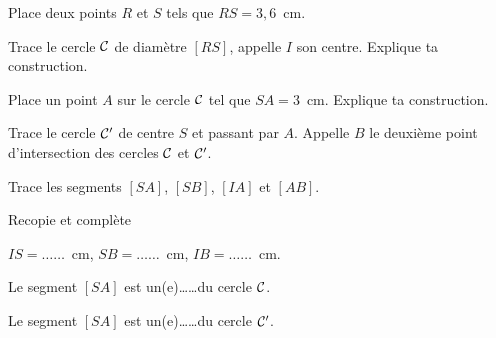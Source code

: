 \begin{myenumerate}
\item Place deux points $R$ et $S$ tels que $RS=3,6$~cm.\par Trace le
cercle $\cal C$ de diamètre $[RS]$, appelle $I$ son centre. Explique
ta construction.
\item Place un point $A$ sur le cercle $\cal C$ tel que
$SA=3$~cm. Explique ta construction.
\par Trace le cercle $\cal C'$ de centre $S$ et passant par
$A$. Appelle $B$ le deuxième point d'intersection des cercles $\cal C$
et $\cal C'$.
\item Trace les segments $[SA]$, $[SB]$, $[IA]$ et $[AB]$.
\item Recopie et complète
\par$IS=\dots\dots$~cm, $SB=\dots\dots$~cm, $IB=\dots\dots$~cm.
\par Le segment $[SA]$ est un(e)\dots\dots du cercle $\cal C$.
\par Le segment $[SA]$ est un(e)\dots\dots du cercle $\cal C'$.
\end{myenumerate}
